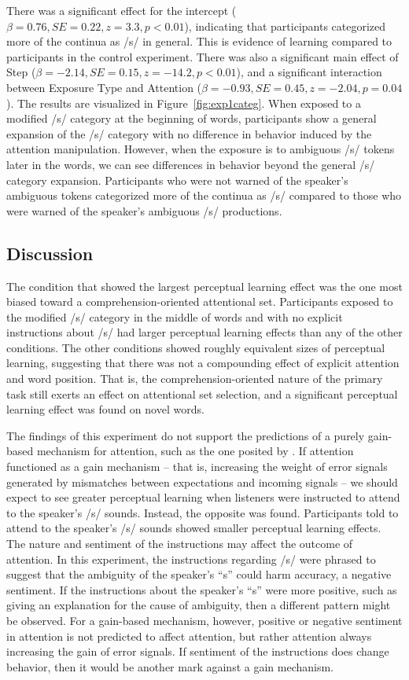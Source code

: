 There was a significant effect for the intercept ($\beta = 0.76, SE = 0.22, z = 3.3, p < 0.01$), indicating that participants categorized more of the continua as /s/ in general.  
This is evidence of learning compared to participants in the control experiment.
There was also a significant main effect of Step ($\beta = -2.14, SE = 0.15, z = -14.2, p < 0.01$), and a significant interaction between Exposure Type and Attention ($\beta = -0.93, SE = 0.45, z = -2.04, p = 0.04$).  The results are visualized in Figure~\ref{fig:exp1categ}.
When exposed to a modified /s/ category at the beginning of words, participants show a general expansion of the /s/ category with no difference in behavior induced by the attention manipulation.  
However, when the exposure is to ambiguous /s/ tokens later in the words, we can see differences in behavior beyond the general /s/ category expansion.  
Participants who were not warned of the speaker's ambiguous tokens categorized more of the continua as /s/ compared to those who were warned of the speaker's ambiguous /s/ productions.

\subsection{Discussion}

The condition that showed the largest perceptual learning effect was the one most biased toward a comprehension-oriented attentional set.
Participants exposed to the modified /s/ category in the middle of words and with no explicit instructions about /s/ had larger perceptual learning effects than any of the other conditions.
The other conditions showed roughly equivalent sizes of perceptual learning, suggesting that there was not a compounding effect of explicit attention and word position.
That is, the comprehension-oriented nature of the primary task still exerts an effect on attentional set selection, and a significant perceptual learning effect was found on novel words.

The findings of this experiment do not support the predictions of a purely gain-based mechanism for attention, such as the one posited by \citet{Clark2013}.
If attention functioned as a gain mechanism -- that is, increasing the weight of error signals generated by mismatches between expectations and incoming signals -- we should expect to see greater perceptual learning when listeners were instructed to attend to the speaker's /s/ sounds.
Instead, the opposite was found.
Participants told to attend to the speaker's /s/ sounds showed smaller perceptual learning effects.
The nature and sentiment of the instructions may affect the outcome of attention.
In this experiment, the instructions regarding /s/ were phrased to suggest that the ambiguity of the speaker's ``s'' could harm accuracy, a negative sentiment.
If the instructions about the speaker's ``s'' were more positive, such as giving an explanation for the cause of ambiguity, then a different pattern might be observed.
For a gain-based mechanism, however, positive or negative sentiment in attention is not predicted to affect attention, but rather attention always increasing the gain of error signals.
If sentiment of the instructions does change behavior, then it would be another mark against a gain mechanism.

